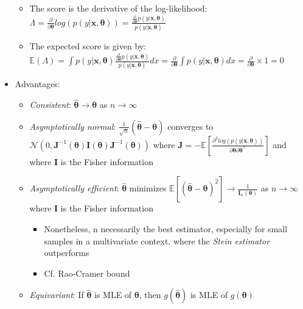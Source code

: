 \begin{itemize}
    \begin{itemize}
        \item The score is the derivative of the log-likelihood: $\Lambda = \frac{\partial}{\partial \boldsymbol{\theta}} log(p(y |\boldsymbol{x}, \boldsymbol{\theta})) = \frac{ \frac{\partial}{\partial \boldsymbol{\theta}} p(y |\boldsymbol{x}, \boldsymbol{\theta})}{ p(y |\boldsymbol{x}, \boldsymbol{\theta}) }$
        \item The expected score is given by: $\mathbb{E}(\Lambda) = \int p(y |\boldsymbol{x}, \boldsymbol{\theta}) \frac{ \frac{\partial}{\partial \boldsymbol{\theta}} p(y |\boldsymbol{x}, \boldsymbol{\theta})}{ p(y |\boldsymbol{x}, \boldsymbol{\theta}) } dx = \frac{\partial}{\partial \boldsymbol{\theta}} \int p(y |\boldsymbol{x}, \boldsymbol{\theta}) dx = \frac{\partial}{\partial \boldsymbol{\theta}} \times 1 = 0$
    \end{itemize}
    \item Advantages:
    \begin{itemize}
        \item \emph{Consistent}: $\hat{\boldsymbol{\theta}} \rightarrow \boldsymbol{\theta}$ as $n \rightarrow \infty$
        \item \emph{Asymptotically normal}: $\frac{1}{\sqrt{n}} (\hat{\boldsymbol{\theta}} - \boldsymbol{\theta})$ converges to $\mathcal{N}(0 , \boldsymbol{J}^{-1} (\boldsymbol{\theta}) \boldsymbol{I}(\boldsymbol{\theta}) \boldsymbol{J}^{-1} (\boldsymbol{\theta}) )$ where $\boldsymbol{J} = -\mathbb{E}[ \frac{ \partial^2 log( p(y |\boldsymbol{x}, \boldsymbol{\theta}) ) }{ \partial \boldsymbol{\theta} \partial \boldsymbol{\theta}^\intercal } ]$ and where $\boldsymbol{I}$ is the Fisher information
        \item \emph{Asymptotically efficient}: $\hat{\boldsymbol{\theta}}$ minimizes $\mathbb{E} [ ( \hat{\boldsymbol{\theta}} - \boldsymbol{\theta} )^2 ] \to \frac{1}{\boldsymbol{I}_n(\boldsymbol{\theta})}$ as $n \rightarrow \infty$ where $\boldsymbol{I}$ is the Fisher information 
        \begin{itemize}
            \item Nonetheless, n necessarily the best estimator, especially for small samples in a multivariate context, where the \emph{Stein estimator} outperforms
            \item Cf. Rao-Cramer bound
        \end{itemize}
        \item \emph{Equivariant}: If $\hat{\boldsymbol{\theta}}$ is MLE of $\boldsymbol{\theta}$, then $g(\hat{\boldsymbol{\theta}})$ is MLE of $g(\boldsymbol{\theta})$

\end{itemize}
\end{itemize}
